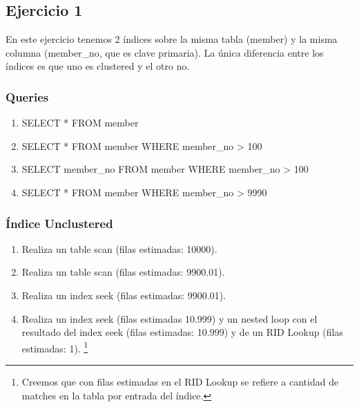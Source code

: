
\subsection{Ejercicio 1}

En este ejercicio tenemos 2 índices sobre la misma tabla (member) y la misma columna (member\_no, que es clave primaria).
La única diferencia entre los índices es que uno es clustered y el otro no.

\subsubsection{Queries}

\begin{enumerate}[label=(\alph*)]
\item SELECT * FROM member
\item SELECT * FROM member WHERE member\_no > 100
\item SELECT member\_no FROM member WHERE member\_no > 100
\item SELECT * FROM member WHERE member\_no > 9990
\end{enumerate}

\subsubsection{Índice Unclustered}
\begin{enumerate}[label=(\alph*)]
  \item Realiza un table scan (filas estimadas: 10000).
  \item Realiza un table scan (filas estimadas: 9900.01).
  \item Realiza un index seek (filas estimadas: 9900.01).
  \item Realiza un index seek (filas estimadas 10.999) y un nested loop con el resultado del index seek (filas estimadas: 10.999) y de un RID Lookup (filas estimadas: 1).
  \footnote{Creemos que con filas estimadas en el RID Lookup se refiere a cantidad de matches en la tabla por entrada del índice.}
\end{enumerate}

